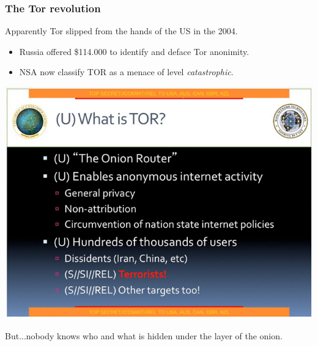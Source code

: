 \begin{frame}
	\frametitle{The Tor revolution}
	Apparently Tor slipped from the hands of the US in the 2004.
	\begin{minipage}{.49\textwidth}

	\begin{itemize}
		\item Russia offered \$114.000 to identify and deface Tor
		anonimity.
		\item NSA now classify TOR as a menace of level
		\textit{catastrophic}.
	\end{itemize}
	\end{minipage}
	\begin{minipage}{.5\textwidth}
		\includegraphics[scale=0.35]{imgs/nsa_tor}
	\end{minipage}
	But...nobody knows who and what is hidden under the layer of the onion.
\end{frame}
